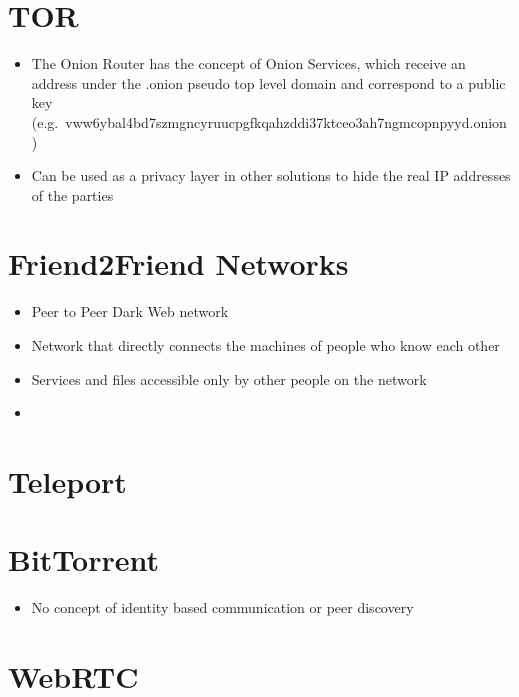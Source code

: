 \hypertarget{tor}{%
\section{TOR}\label{tor}}

\begin{itemize}
\tightlist
\item
  The Onion Router has the concept of Onion Services, which receive an
  address under the .onion pseudo top level domain and correspond to a
  public key
  (e.g.~vww6ybal4bd7szmgncyruucpgfkqahzddi37ktceo3ah7ngmcopnpyyd.onion)
\item
  Can be used as a privacy layer in other solutions to hide the real IP
  addresses of the parties
\end{itemize}

\hypertarget{friend2friend-networks}{%
\section{Friend2Friend Networks}\label{friend2friend-networks}}

\begin{itemize}
\tightlist
\item
  Peer to Peer Dark Web network
\item
  Network that directly connects the machines of people who know each
  other
\item
  Services and files accessible only by other people on the network
\item
\end{itemize}

\hypertarget{teleport}{%
\section{Teleport}\label{teleport}}

\hypertarget{bittorrent}{%
\section{BitTorrent}\label{bittorrent}}

\begin{itemize}
\tightlist
\item
  No concept of identity based communication or peer discovery
\end{itemize}

\hypertarget{webrtc}{%
\section{WebRTC}\label{webrtc}}

